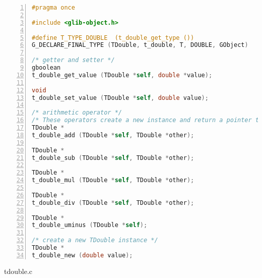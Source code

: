 \begin{lstlisting}[language=C, numbers=left]
#pragma once

#include <glib-object.h>

#define T_TYPE_DOUBLE  (t_double_get_type ())
G_DECLARE_FINAL_TYPE (TDouble, t_double, T, DOUBLE, GObject)

/* getter and setter */
gboolean
t_double_get_value (TDouble *self, double *value);

void
t_double_set_value (TDouble *self, double value);

/* arithmetic operator */
/* These operators create a new instance and return a pointer to it. */
TDouble *
t_double_add (TDouble *self, TDouble *other);

TDouble *
t_double_sub (TDouble *self, TDouble *other);

TDouble *
t_double_mul (TDouble *self, TDouble *other);

TDouble *
t_double_div (TDouble *self, TDouble *other);

TDouble *
t_double_uminus (TDouble *self);

/* create a new TDouble instance */
TDouble *
t_double_new (double value);
\end{lstlisting}

tdouble.c

